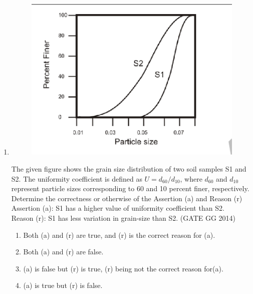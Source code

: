 \documentclass[journal]{IEEEtran}
\begin{document}
\begin{enumerate}[start=1]
\item 
\begin{figure}[H]
    \centering
    \includegraphics[width=0.5\columnwidth]{figs/06.png} 
    \caption{}
    \label{fig:48}
\end{figure}
The given figure shows the grain size distribution of two soil samples S1 and S2.  
The uniformity coefficient is defined as \( U = d_{60} / d_{10} \), where \( d_{60} \) and \( d_{10} \) represent particle sizes corresponding to 60 and 10 percent  finer, respectively. Determine the correctness or otherwise of the Assertion (a) and Reason (r)\\
Assertion (a): S1 has a higher value of uniformity coefficient than S2.\\ 
Reason (r): S1 has less variation in grain-size than S2.
\hfill(GATE GG 2014)
\begin{enumerate}
    \item Both (a) and (r) are true, and (r) is the correct reason for (a).
    \item Both (a) and (r) are false.
    \item (a) is false but (r) is true, (r) being not the correct reason for(a).
    \item (a) is true but (r) is false.
\end{enumerate}


\end{enumerate}
\end{document}
